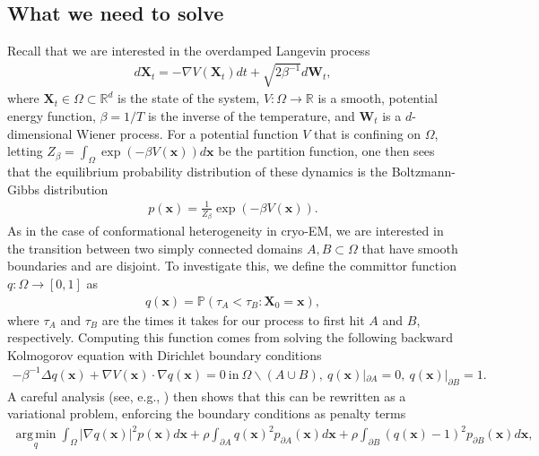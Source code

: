 \documentclass[11pt]{amsart}
\newcommand{\RR}{\mathbb{R}}
\newcommand{\PP}{\mathbb{P}}
\begin{document}
\subsection{What we need to solve}
Recall that we are interested in the overdamped Langevin process
\begin{align}
    d\boldsymbol{X}_t=-\nabla V(\boldsymbol{X}_t)dt+\sqrt{2\beta^{-1}}d\boldsymbol{W}_t,
\end{align}
where $\boldsymbol{X}_t\in\Omega\subset\RR^d$ is the state of the system, $V:\Omega\to\RR$ is a smooth, potential energy function, $\beta=1/T$ is the inverse of the temperature, and $\boldsymbol{W}_t$ is a $d$-dimensional Wiener process. For a potential function $V$ that is confining on $\Omega$, letting $Z_\beta=\int_\Omega\exp(-\beta V(\boldsymbol{x}))d\boldsymbol{x}$ be the partition function, one then sees that the equilibrium probability distribution of these dynamics is the Boltzmann-Gibbs distribution
\begin{align}
    p(\boldsymbol{x})=\frac{1}{Z_\beta}\exp(-\beta V(\boldsymbol{x})).
\end{align}
As in the case of conformational heterogeneity in cryo-EM, we are interested in the transition between two simply connected domains $A,B\subset\Omega$ that have smooth boundaries and are disjoint. To investigate this, we define the committor function $q:\Omega\to[0,1]$ as
\begin{align}
    q(\boldsymbol{x})=\PP(\tau_A<\tau_B:\boldsymbol{X}_0=\boldsymbol{x}),
\end{align}
where $\tau_A$ and $\tau_B$ are the times it takes for our process to first hit $A$ and $B$, respectively. Computing this function comes from solving the following backward Kolmogorov equation with Dirichlet boundary conditions
\begin{align}
    -\beta^{-1}\Delta q(\boldsymbol{x})+\nabla V(\boldsymbol{x})\cdot\nabla q(\boldsymbol{x})=0 \ \text{in}\ \Omega\backslash(A\cup B), \ q(\boldsymbol{x})|_{\partial A}=0,\ q(\boldsymbol{x})|_{\partial B}=1.
\end{align}
A careful analysis (see, e.g., \cite{varCommitt}) then shows that this can be rewritten as a variational problem, enforcing the boundary conditions as penalty terms
\begin{align}
    \operatorname*{arg\,min}_q\int_\Omega|\nabla q(\boldsymbol{x})|^2p(\boldsymbol{x})d\boldsymbol{x}+\rho\int_{\partial A}q(\boldsymbol{x})^2p_{\partial A}(\boldsymbol{x})d\boldsymbol{x}+\rho\int_{\partial B}(q(\boldsymbol{x})-1)^2p_{\partial B}(\boldsymbol{x})d\boldsymbol{x},
\end{align}
\end{document}
